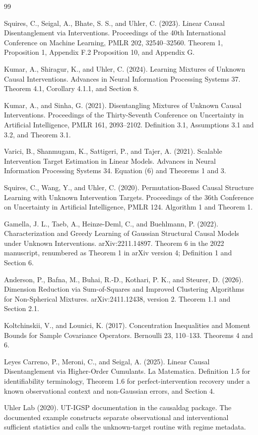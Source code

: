 \documentclass{article}
\begin{document}
\begin{thebibliography}{99}

   Squires, C., Seigal, A., Bhate, S. S., and Uhler, C. (2023). Linear Causal Disentanglement via Interventions. Proceedings of the 40th International Conference on Machine Learning, PMLR 202, 32540--32560. Theorem 1, Proposition 1, Appendix F.2 Proposition 10, and Appendix G.

   Kumar, A., Shiragur, K., and Uhler, C. (2024). Learning Mixtures of Unknown Causal Interventions. Advances in Neural Information Processing Systems 37. Theorem 4.1, Corollary 4.1.1, and Section 8.

   Kumar, A., and Sinha, G. (2021). Disentangling Mixtures of Unknown Causal Interventions. Proceedings of the Thirty-Seventh Conference on Uncertainty in Artificial Intelligence, PMLR 161, 2093--2102. Definition 3.1, Assumptions 3.1 and 3.2, and Theorem 3.1.

   Varici, B., Shanmugam, K., Sattigeri, P., and Tajer, A. (2021). Scalable Intervention Target Estimation in Linear Models. Advances in Neural Information Processing Systems 34. Equation (6) and Theorems 1 and 3.

   Squires, C., Wang, Y., and Uhler, C. (2020). Permutation-Based Causal Structure Learning with Unknown Intervention Targets. Proceedings of the 36th Conference on Uncertainty in Artificial Intelligence, PMLR 124. Algorithm 1 and Theorem 1.

   Gamella, J. L., Taeb, A., Heinze-Deml, C., and Buehlmann, P. (2022). Characterization and Greedy Learning of Gaussian Structural Causal Models under Unknown Interventions. arXiv:2211.14897. Theorem 6 in the 2022 manuscript, renumbered as Theorem 1 in arXiv version 4; Definition 1 and Section 6.

   Anderson, P., Bafna, M., Buhai, R.-D., Kothari, P. K., and Steurer, D. (2026). Dimension Reduction via Sum-of-Squares and Improved Clustering Algorithms for Non-Spherical Mixtures. arXiv:2411.12438, version 2. Theorem 1.1 and Section 2.1.

   Koltchinskii, V., and Lounici, K. (2017). Concentration Inequalities and Moment Bounds for Sample Covariance Operators. Bernoulli 23, 110--133. Theorems 4 and 6.

   Leyes Carreno, P., Meroni, C., and Seigal, A. (2025). Linear Causal Disentanglement via Higher-Order Cumulants. La Matematica. Definition 1.5 for identifiability terminology, Theorem 1.6 for perfect-intervention recovery under a known observational context and non-Gaussian errors, and Section 4.

   Uhler Lab (2020). UT-IGSP documentation in the causaldag package. The documented example constructs separate observational and interventional sufficient statistics and calls the unknown-target routine with regime metadata.

\end{thebibliography}
\end{document}
